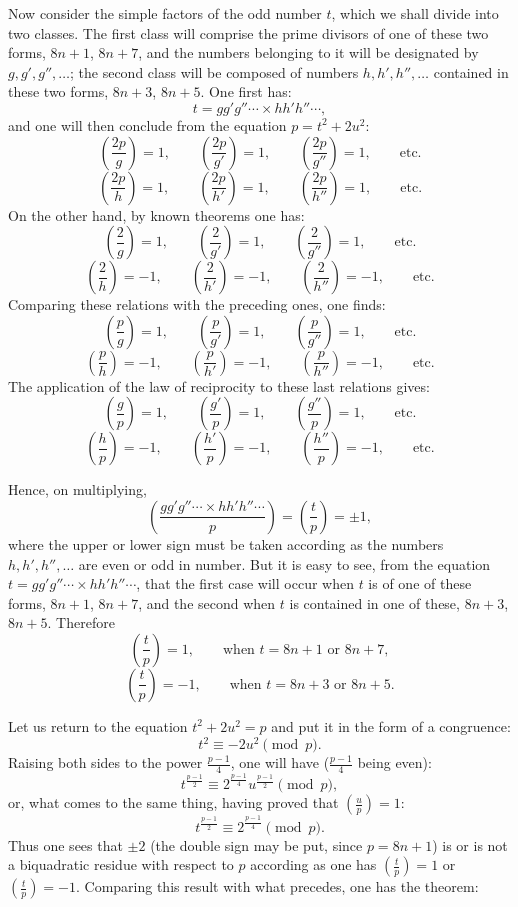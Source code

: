 \documentclass[11pt]{article}
\newcommand{\leg}[2]{\left(\frac{#1}{#2}\right)}
\newcommand{\unitid}[1]{\hypertarget{#1}{}}
\begin{document}
\unitid{dirichlet.v1.p04a.en.par.009}Now consider the simple factors of the odd number $t$, which we shall divide into two classes. The first class will comprise the prime divisors of one of these two forms, $8n+1$, $8n+7$, and the numbers belonging to it will be designated by $g,g',g'',\ldots$; the second class will be composed of numbers $h,h',h'',\ldots$ contained in these two forms, $8n+3$, $8n+5$. One first has:
\[
 t=gg'g''\cdots\times hh'h''\cdots,
\]
and one will then conclude from the equation $p=t^2+2u^2$:
\[
\leg{2p}{g}=1,
\qquad \leg{2p}{g'}=1,
\qquad \leg{2p}{g''}=1,
\qquad \text{etc.}
\]
\[
\leg{2p}{h}=1,
\qquad \leg{2p}{h'}=1,
\qquad \leg{2p}{h''}=1,
\qquad \text{etc.}
\]
On the other hand, by known theorems one has:
\[
\leg{2}{g}=1,
\qquad \leg{2}{g'}=1,
\qquad \leg{2}{g''}=1,
\qquad \text{etc.}
\]
\[
\leg{2}{h}=-1,
\qquad \leg{2}{h'}=-1,
\qquad \leg{2}{h''}=-1,
\qquad \text{etc.}
\]
Comparing these relations with the preceding ones, one finds:
\[
\leg{p}{g}=1,
\qquad \leg{p}{g'}=1,
\qquad \leg{p}{g''}=1,
\qquad \text{etc.}
\]
\[
\leg{p}{h}=-1,
\qquad \leg{p}{h'}=-1,
\qquad \leg{p}{h''}=-1,
\qquad \text{etc.}
\]
The application of the law of reciprocity to these last relations gives:
\[
\leg{g}{p}=1,
\qquad \leg{g'}{p}=1,
\qquad \leg{g''}{p}=1,
\qquad \text{etc.}
\]
\[
\leg{h}{p}=-1,
\qquad \leg{h'}{p}=-1,
\qquad \leg{h''}{p}=-1,
\qquad \text{etc.}
\]

\unitid{dirichlet.v1.p04a.en.par.010}Hence, on multiplying,
\[
 \leg{gg'g''\cdots\times hh'h''\cdots}{p}=\leg{t}{p}=\pm1,
\]
where the upper or lower sign must be taken according as the numbers $h,h',h'',\ldots$ are even or odd in number. But it is easy to see, from the equation $t=gg'g''\cdots\times hh'h''\cdots$, that the first case will occur when $t$ is of one of these forms, $8n+1$, $8n+7$, and the second when $t$ is contained in one of these, $8n+3$, $8n+5$. Therefore
\[
\leg{t}{p}=1,\qquad \text{when } t=8n+1\text{ or }8n+7,
\]
\[
\leg{t}{p}=-1,\qquad \text{when } t=8n+3\text{ or }8n+5.
\]

\unitid{dirichlet.v1.p04a.en.par.011}Let us return to the equation $t^2+2u^2=p$ and put it in the form of a congruence:
\[
 t^2\equiv -2u^2 \pmod p.
\]
Raising both sides to the power $\frac{p-1}{4}$, one will have ($\frac{p-1}{4}$ being even):
\[
 t^{\frac{p-1}{2}}\equiv 2^{\frac{p-1}{4}}u^{\frac{p-1}{2}}\pmod p,
\]
or, what comes to the same thing, having proved that $\leg{u}{p}=1$:
\[
 t^{\frac{p-1}{2}}\equiv 2^{\frac{p-1}{4}}\pmod p.
\]
Thus one sees that $\pm2$ (the double sign may be put, since $p=8n+1$) is or is not a biquadratic residue with respect to $p$ according as one has $\leg{t}{p}=1$ or $\leg{t}{p}=-1$. Comparing this result with what precedes, one has the theorem:
\end{document}
